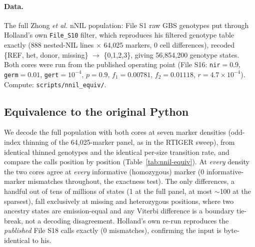 \documentclass[11pt]{article}
\newcommand{\code}[1]{\texttt{#1}}
\begin{document}
\paragraph{Data.} The full Zhong \emph{et al.} nNIL population: File S1 raw GBS
genotypes put through Holland's own \code{File\_S10} filter, which reproduces his
filtered genotype table exactly (888 nested-NIL lines $\times$ 64{,}025 markers, 0
cell differences), recoded \{REF, het, donor, missing\} $\to$
\{0,1,2,3\}, giving 56{,}854{,}200 genotype states. Both cores were run from the
published operating point (File S16: \code{nir}$=0.9$, \code{germ}$=0.01$,
\code{gert}$=10^{-4}$, $p=0.9$, $f_1=0.00781$, $f_2=0.01118$, $r=4.7\times10^{-4}$).
Compute: \code{scripts/nnil\_equiv/}.

\clearpage
\subsection{Equivalence to the original Python}
We decode the full population with both cores at seven marker densities (odd-index
thinning of the 64{,}025-marker panel, as in the RTIGER sweep), from identical
thinned genotypes and the identical per-size transition rate, and compare the calls
position by position (Table~\ref{tab:nnil-equiv}). At \emph{every} density the two
cores agree at \emph{every} informative (homozygous) marker (0 informative-marker
mismatches throughout, the exactness test). The only differences, a handful out of
tens of millions of states (1 at the full panel, at most $\sim$100 at the sparsest),
fall exclusively at missing and heterozygous positions, where two ancestry states
are emission-equal and any Viterbi difference is a boundary tie-break, not a
decoding disagreement. Holland's own re-run reproduces the \emph{published} File S18
calls exactly (0 mismatches), confirming the input is byte-identical to his.
\end{document}
